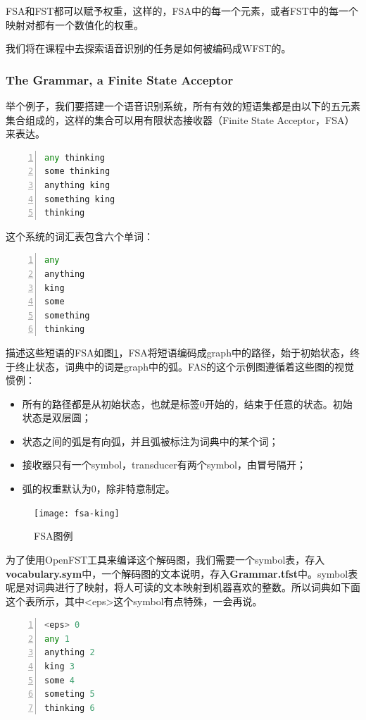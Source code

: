 FSA和FST都可以赋予权重，这样的，FSA中的每一个元素，或者FST中的每一个映射对都有一个数值化的权重。

我们将在课程中去探索语音识别的任务是如何被编码成WFST的。

\subsubsection{The Grammar, a Finite State Acceptor}
举个例子，我们要搭建一个语音识别系统，所有有效的短语集都是由以下的五元素集合组成的，这样的集合可以用有限状态接收器（Finite State Acceptor，FSA）来表达。
\begin{lstlisting}[language = python, numbers=left, 
   numberstyle=\tiny,keywordstyle=\color{blue!70},
   commentstyle=\color{red!50!green!50!blue!50},frame=shadowbox,
   rulesepcolor=\color{red!20!green!20!blue!20},basicstyle=\ttfamily]
any thinking
some thinking
anything king
something king
thinking
\end{lstlisting}

这个系统的词汇表包含六个单词：
\begin{lstlisting}[language = python, numbers=left, 
   numberstyle=\tiny,keywordstyle=\color{blue!70},
   commentstyle=\color{red!50!green!50!blue!50},frame=shadowbox,
   rulesepcolor=\color{red!20!green!20!blue!20},basicstyle=\ttfamily]
any 
anything
king
some
something
thinking
\end{lstlisting}

描述这些短语的FSA如图\ref{fig:fsa-king}，FSA将短语编码成graph中的路径，始于初始状态，终于终止状态，词典中的词是graph中的弧。FAS的这个示例图遵循着这些图的视觉惯例：
\begin{itemize}
  \item 所有的路径都是从初始状态，也就是标签0开始的，结束于任意的状态。初始状态是双层圆；
  \item 状态之间的弧是有向弧，并且弧被标注为词典中的某个词；
  \item 接收器只有一个symbol，transducer有两个symbol，由冒号隔开；
  \item 弧的权重默认为0，除非特意制定。
\end{itemize}
\begin{figure}[htbp]
  \centering
  \texttt{[image: fsa-king]}
  \caption{FSA图例 \label{fig:fsa-king}}
\end{figure}

为了使用OpenFST工具来编译这个解码图，我们需要一个symbol表，存入{\bf vocabulary.sym}中，一个解码图的文本说明，存入{\bf Grammar.tfst}中。symbol表呢是对词典进行了映射，将人可读的文本映射到机器喜欢的整数。所以词典如下面这个表所示，其中<eps>这个symbol有点特殊，一会再说。
\begin{lstlisting}[language = python, numbers=left, 
   numberstyle=\tiny,keywordstyle=\color{blue!70},
   commentstyle=\color{red!50!green!50!blue!50},frame=shadowbox,
   rulesepcolor=\color{red!20!green!20!blue!20},basicstyle=\ttfamily]
<eps> 0
any 1
anything 2
king 3
some 4
someting 5
thinking 6
\end{lstlisting}

